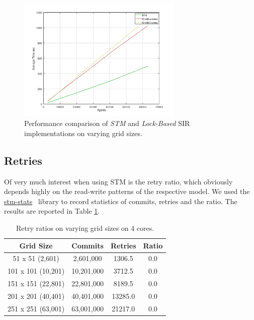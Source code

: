 \begin{figure}
	\centering
	\includegraphics[width=0.7\textwidth, angle=0]{./fig/sir/stm_io_varyinggrid_performance.png}
	\caption{Performance comparison of \textit{STM} and \textit{Lock-Based} SIR implementations on varying grid sizes.}
	\label{fig:varyinggrid_constcores}
\end{figure}

\subsection{Retries}
Of very much interest when using STM is the retry ratio, which obviously depends highly on the read-write patterns of the respective model. We used the \href{http://hackage.haskell.org/package/stm-stats}{stm-stats}~\cite{stm_stats_library} library to record statistics of commits, retries and the ratio. The results are reported in Table \ref{tab:retries_stm}.

\begin{table}
	\centering
  	\begin{tabular}{ c || c | c | c }
        Grid Size 		   & Commits    & Retries & Ratio \\ \hline \hline 
   		51 x 51 (2,601)    & 2,601,000  & 1306.5  & 0.0 \\ \hline
   		101 x 101 (10,201) & 10,201,000 & 3712.5  & 0.0 \\ \hline
   		151 x 151 (22,801) & 22,801,000 & 8189.5  & 0.0 \\ \hline
   		201 x 201 (40,401) & 40,401,000 & 13285.0 & 0.0 \\ \hline 
   		251 x 251 (63,001) & 63,001,000 & 21217.0 & 0.0 \\ \hline \hline
  	\end{tabular}
  	
  	\caption{Retry ratios on varying grid sizes on 4 cores.}
	\label{tab:retries_stm}
\end{table}

